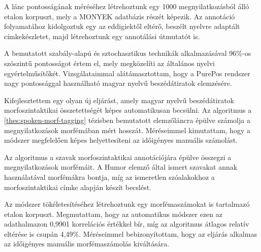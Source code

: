 A lánc pontosságának méréséhez létrehoztunk egy 1000 megnyilatkozásból álló etalon korpuszt, mely a MONYEK \cite{Matyus2014} adatbázis részét képezik. 
Az annotáció folyamatához kidolgoztuk egy az eddigiektől eltérő, beszélt nyelvre adaptált címkekészletet, majd létrehoztunk egy annotálási útmutatót is.

A bemutatott szabály-alapú és sztochasztikus technikák alkalmazásával 96\%-os szószintű pontosságot értem el, mely megközelíti az általános nyelvi egyértelműsítőkét.
Vizsgálataimmal alátámasztottam, hogy a PurePos rendszer nagy pontossággal használható magyar nyelvű beszédátiratok elemzésére. 


\thesisline%


\begin{core}
\begin{thesis}
\label{thes:mlu-estimation}
Kifejlesztettem egy olyan új eljárást, amely magyar nyelvű beszédátiratok morfoszintaktikai összetettségét képes automatikusan becsülni.
Az algoritmus a \ref{thes:spoken-morf-tagging} tézisben bemutatott elemzőláncra épülve számolja a megnyilatkozások morfémában mért hosszát. 
Méréseimmel kimutattam, hogy a módszer megfelelően képes helyettesíteni az időigényes manuális számolást.
\end{thesis}

\begin{pub}
\cite{Matyus2014,Orosz2014c}
\end{pub}
\end{core}

Az algoritmus a szavak morfoszintaktikai annotációjára épülve összegzi a megnyilatkozások morfémáit.
A Humor elemző által ismert szavakat annak használatával morfémákra bontja, míg az ismeretlen szóalakokhoz a morfoszintaktikai címke alapján készít becslést.

Az módszer tökéletesítéséhez létrehoztunk egy morfémaszámokat is tartalmazó etalon korpuszt. 
Megmutattam, hogy az automatikus módszer ezen az adathalmazon 0,9901 korrelációs értékkel bír, míg az algoritmus átlagos relatív eltérése  is csupán 4,49\%. 
Méréseimmel bebizonyítottam, hogy az eljárás alkalmas az időigényes manuális morfémaszámolás kiváltására.

